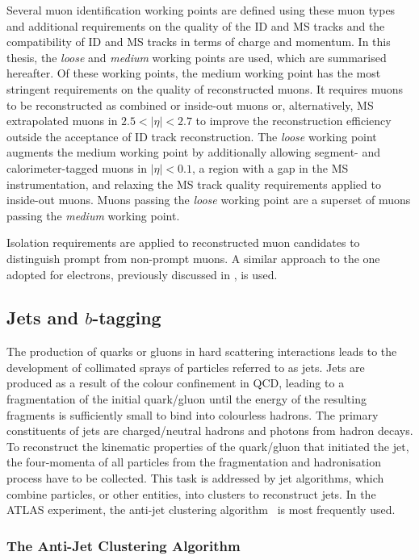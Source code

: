 Several muon identification working points are defined using these muon types
and additional requirements on the quality of the ID and MS tracks and the
compatibility of ID and MS tracks in terms of charge and momentum. In this
thesis, the \emph{loose} and \emph{medium} working points are used, which are
summarised hereafter. Of these working points, the medium working point has the
most stringent requirements on the quality of reconstructed muons. It requires
muons to be reconstructed as combined or inside-out muons or, alternatively, MS
extrapolated muons in $2.5 < |\eta| < 2.7$ to improve the reconstruction
efficiency outside the acceptance of ID track reconstruction. The \emph{loose}
working point augments the medium working point by additionally allowing
segment- and calorimeter-tagged muons in $|\eta| < 0.1$, a region with a gap in
the MS instrumentation, and relaxing the MS track quality requirements applied
to inside-out muons. Muons passing the \emph{loose} working point are a superset
of muons passing the \emph{medium} working point.

Isolation requirements are applied to reconstructed muon candidates to
distinguish prompt from non-prompt muons. A similar approach to the one adopted
for electrons, previously discussed in , is used.


\subsection{Jets and $b$-tagging}%
\label{sec:jet_rec}

The production of quarks or gluons in hard scattering interactions leads to the
development of collimated sprays of particles referred to as jets. Jets are
produced as a result of the colour confinement in QCD, leading to a
fragmentation of the initial quark/gluon until the energy of the resulting
fragments is sufficiently small to bind into colourless hadrons. The primary
constituents of jets are charged/neutral hadrons and photons from hadron
decays. To reconstruct the kinematic properties of the quark/gluon that
initiated the jet, the four-momenta of all particles from the fragmentation and
hadronisation process have to be collected. This task is addressed by jet
algorithms, which combine particles, or other entities, into clusters to
reconstruct jets. In the ATLAS experiment, the anti-\kt jet clustering
algorithm~\cite{Cacciari:2008gp} is most frequently used.


\subsubsection{The Anti-\kt Jet Clustering Algorithm}

